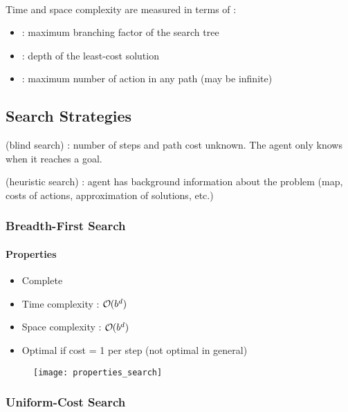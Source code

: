 \\
Time and space complexity are measured in terms of :
\begin{itemize}
\item {} : maximum branching factor of the search tree
\item {} : depth of the least-cost solution
\item {} : maximum number of action in any path (may be infinite)
\end{itemize}

\subsection{Search Strategies}

 (blind search) : number of steps and path cost unknown. The agent only knows when it reaches a goal.

 (heuristic search) : agent has background information about the problem (map, costs of actions, approximation of solutions, etc.)

\subsubsection{Breadth-First Search}

\paragraph{Properties}
\begin{minipage}{0.59\textwidth}
	\begin{itemize}
	\item Complete
	\item Time complexity : $\bigO (b^d)$
	\item Space complexity : $\bigO (b^d)$
	\item Optimal if cost = 1 per step (not optimal in general)
	\end{itemize}
\end{minipage}
\begin{minipage}{0.4\textwidth}
	\begin{figure}[H]
		\centering
    		\texttt{[image: properties\_search]}
	\end{figure}
\end{minipage}

\subsubsection{Uniform-Cost Search}

